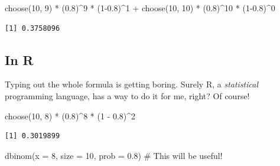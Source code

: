 \documentclass[
  letterpaper,
  DIV=11,
  numbers=noendperiod,
  oneside]{scrreprt}
\newenvironment{Shaded}{\begin{snugshade}}{\end{snugshade}}
\newcommand{\AttributeTok}[1]{\textcolor[rgb]{0.40,0.45,0.13}{#1}}
\newcommand{\CommentTok}[1]{\textcolor[rgb]{0.37,0.37,0.37}{#1}}
\newcommand{\DecValTok}[1]{\textcolor[rgb]{0.68,0.00,0.00}{#1}}
\newcommand{\FloatTok}[1]{\textcolor[rgb]{0.68,0.00,0.00}{#1}}
\newcommand{\FunctionTok}[1]{\textcolor[rgb]{0.28,0.35,0.67}{#1}}
\newcommand{\NormalTok}[1]{\textcolor[rgb]{0.00,0.23,0.31}{#1}}
\newcommand{\SpecialCharTok}[1]{\textcolor[rgb]{0.37,0.37,0.37}{#1}}
\begin{document}
\begin{Shaded}
\begin{Highlighting}[]
\FunctionTok{choose}\NormalTok{(}\DecValTok{10}\NormalTok{, }\DecValTok{9}\NormalTok{) }\SpecialCharTok{*}\NormalTok{ (}\FloatTok{0.8}\NormalTok{)}\SpecialCharTok{\^{}}\DecValTok{9} \SpecialCharTok{*}\NormalTok{ (}\DecValTok{1}\FloatTok{{-}0.8}\NormalTok{)}\SpecialCharTok{\^{}}\DecValTok{1} \SpecialCharTok{+}
  \FunctionTok{choose}\NormalTok{(}\DecValTok{10}\NormalTok{, }\DecValTok{10}\NormalTok{) }\SpecialCharTok{*}\NormalTok{ (}\FloatTok{0.8}\NormalTok{)}\SpecialCharTok{\^{}}\DecValTok{10} \SpecialCharTok{*}\NormalTok{ (}\DecValTok{1}\FloatTok{{-}0.8}\NormalTok{)}\SpecialCharTok{\^{}}\DecValTok{0}
\end{Highlighting}
\end{Shaded}

\begin{verbatim}
[1] 0.3758096
\end{verbatim}

\hypertarget{in-r}{%
\subsection{In R}\label{in-r}}

Typing out the whole formula is getting boring. Surely R, a
\emph{statistical} programming language, has a way to do it for me,
right? Of course!

\begin{Shaded}
\begin{Highlighting}[]
\FunctionTok{choose}\NormalTok{(}\DecValTok{10}\NormalTok{, }\DecValTok{8}\NormalTok{) }\SpecialCharTok{*}\NormalTok{ (}\FloatTok{0.8}\NormalTok{)}\SpecialCharTok{\^{}}\DecValTok{8} \SpecialCharTok{*}\NormalTok{ (}\DecValTok{1} \SpecialCharTok{{-}} \FloatTok{0.8}\NormalTok{)}\SpecialCharTok{\^{}}\DecValTok{2}
\end{Highlighting}
\end{Shaded}

\begin{verbatim}
[1] 0.3019899
\end{verbatim}

\begin{Shaded}
\begin{Highlighting}[]
\FunctionTok{dbinom}\NormalTok{(}\AttributeTok{x =} \DecValTok{8}\NormalTok{, }\AttributeTok{size =} \DecValTok{10}\NormalTok{, }\AttributeTok{prob =} \FloatTok{0.8}\NormalTok{) }\CommentTok{\# This will be useful!}
\end{Highlighting}
\end{Shaded}
\end{document}
